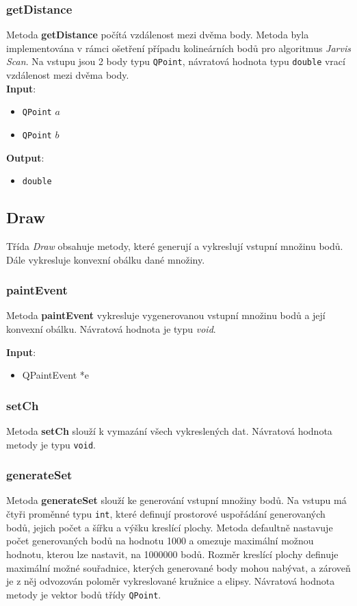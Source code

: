 \documentclass[a4paper, 12pt]{article}
\begin{document}
\subsubsection*{getDistance}
Metoda \textbf{getDistance} počítá vzdálenost mezi dvěma body. Metoda byla implementována v rámci ošetření případu kolineárních bodů pro algoritmus \textit{Jarvis Scan}. Na vstupu jsou 2 body typu \texttt{QPoint}, návratová hodnota typu \texttt{double} vrací vzdálenost mezi dvěma body.\\ 

\textbf{Input}:
\begin{itemize}
\item \texttt{QPoint} $a$ 
\item \texttt{QPoint} $b$
\end{itemize}

\textbf{Output}:
\begin{itemize}
\item \texttt{double} 
\end{itemize}

\subsection{Draw}
Třída \textit{Draw} obsahuje metody, které generují a vykreslují vstupní množinu bodů. Dále vykresluje konvexní obálku dané množiny. 

\subsubsection*{paintEvent}
Metoda \textbf{paintEvent} vykresluje vygenerovanou vstupní množinu bodů a její konvexní obálku. Návratová hodnota je typu \textit{void}.

\textbf{Input}:
\begin{itemize}
\item QPaintEvent *e
\end{itemize}

\subsubsection*{setCh}
Metoda \textbf{setCh} slouží k vymazání všech vykreslených dat. Návratová hodnota metody je typu \texttt{void}.

\subsubsection*{generateSet}
Metoda \textbf{generateSet} slouží ke generování vstupní množiny bodů. Na vstupu má čtyři proměnné typu \texttt{int}, které definují prostorové uspořádání generovaných bodů, jejich počet a šířku a výšku kreslící plochy. Metoda defaultně nastavuje počet generovaných bodů na hodnotu 1000 a omezuje maximální možnou hodnotu, kterou lze nastavit, na 1000000 bodů. Rozměr kreslící plochy definuje maximální možné souřadnice, kterých generované body mohou nabývat, a zároveň je z něj odvozován poloměr vykreslované kružnice a elipsy. Návratová hodnota metody je vektor bodů třídy \texttt{QPoint}.\\
\end{document}

